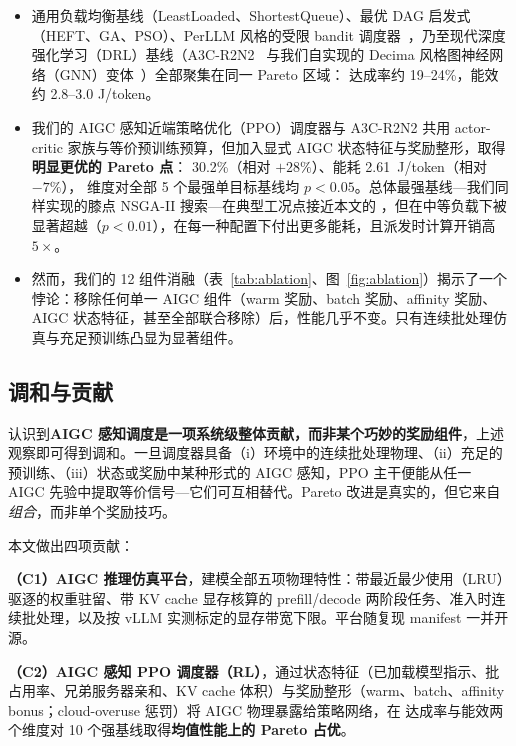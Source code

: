 \begin{itemize}
\item 通用负载均衡基线（LeastLoaded、ShortestQueue）、最优 DAG 启发式（HEFT、GA、PSO）、PerLLM 风格的受限 bandit 调度器~\cite{yang2024perllm}，乃至现代深度强化学习（DRL）基线（A3C-R2N2~\cite{tuli2022a3cr2n} 与我们自实现的 Decima 风格图神经网络（GNN）变体~\cite{mao2019decima}）全部聚集在同一 Pareto 区域：\slo{} 达成率约 19--24\%，能效约 2.8--3.0 J/token。

\item 我们的 AIGC 感知近端策略优化（PPO）调度器与 A3C-R2N2 共用 actor-critic 家族与等价预训练预算，但加入显式 AIGC 状态特征与奖励整形，取得\textbf{明显更优的 Pareto 点}：\slo{} 30.2\%（相对 $+28\%$）、能耗 2.61~J/token（相对 $-7\%$），\slo{} 维度对全部 5 个最强单目标基线均 $p<0.05$。总体最强基线---我们同样实现的膝点 NSGA-II 搜索---在典型工况点接近本文的 \slo{}，但在中等负载下被显著超越（$p<0.01$），在每一种配置下付出更多能耗，且派发时计算开销高 $5\times$。

\item 然而，我们的 12 组件消融（表~\ref{tab:ablation}、图~\ref{fig:ablation}）揭示了一个悖论：移除任何单一 AIGC 组件（warm 奖励、batch 奖励、affinity 奖励、AIGC 状态特征，甚至全部联合移除）后，性能几乎不变。只有连续批处理仿真与充足预训练凸显为显著组件。
\end{itemize}

\subsection{调和与贡献}

认识到\textbf{AIGC 感知调度是一项系统级整体贡献，而非某个巧妙的奖励组件}，上述观察即可得到调和。一旦调度器具备（i）环境中的连续批处理物理、（ii）充足的预训练、（iii）状态或奖励中某种形式的 AIGC 感知，PPO 主干便能从任一 AIGC 先验中提取等价信号---它们可互相替代。Pareto 改进是真实的，但它来自\emph{组合}，而非单个奖励技巧。

\smallskip
\noindent 本文做出四项贡献：

\noindent\textbf{（C1）AIGC 推理仿真平台}，建模全部五项物理特性：带最近最少使用（LRU）驱逐的权重驻留、带 KV cache 显存核算的 prefill/decode 两阶段任务、准入时连续批处理，以及按 vLLM 实测标定的显存带宽下限。平台随复现 manifest 一并开源。

\noindent\textbf{（C2）AIGC 感知 PPO 调度器（RL）}，通过状态特征（已加载模型指示、批占用率、兄弟服务器亲和、KV cache 体积）与奖励整形（warm、batch、affinity bonus；cloud-overuse 惩罚）将 AIGC 物理暴露给策略网络，在 \slo{} 达成率与能效两个维度对 10 个强基线取得\textbf{均值性能上的 Pareto 占优}。

